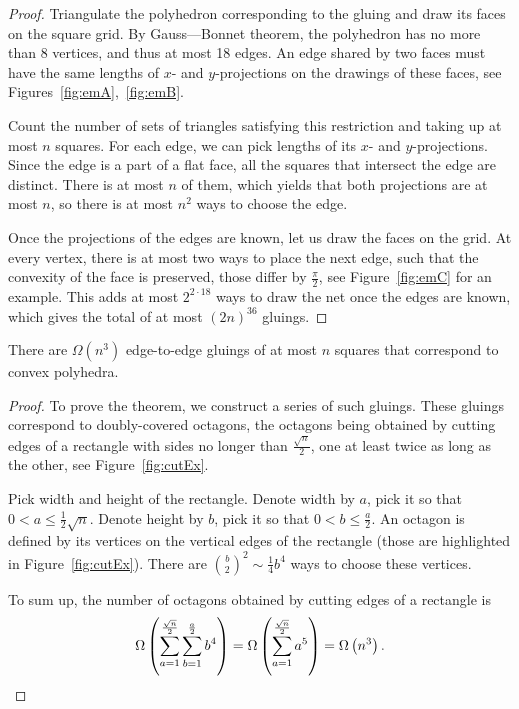 \documentclass[a4paper,11pt]{article}
\begin{document}
\begin{proof}
	Triangulate the polyhedron corresponding to the gluing and draw its faces on the square grid. By Gauss—Bonnet theorem, the polyhedron has no more than 8 vertices, and thus at most 18 edges. An edge shared by two faces must have the same lengths of $x$- and $y$-projections on the drawings of these faces, see Figures~\ref{fig:emA},~\ref{fig:emB}.



Count the number of sets of triangles satisfying this restriction and taking up at most $n$ squares. For each edge, we can pick lengths of its $x$- and $y$-projections. Since the edge is a part of a flat face, all the squares that intersect the edge are distinct. There is at most $n$ of them, which yields that both projections are at most $n$, so there is at most $n^2$ ways to choose the edge.

Once the projections of the edges are known, let us draw the faces on the grid. At every vertex, there is at most two ways to place the next edge, such that the convexity of the face is preserved, those differ by $\frac{\pi}{2}$, see Figure~\ref{fig:emC} for an example. This adds at most $2^{2 \cdot 18}$ ways to draw the net once the edges are known, which gives the total of at most $(2n)^{36}$ gluings.
\end{proof}

\begin{theorem} \label{thm:n3}
	There are $\Omega \left( n^3 \right)$ edge-to-edge gluings of at most $n$ squares that correspond to convex polyhedra.
\end{theorem}

\begin{proof}
To prove the theorem, we construct a series of such gluings. These gluings correspond to doubly-covered octagons, the octagons being obtained by cutting edges of a rectangle with sides no longer than $\frac{\sqrt{n}}{2}$, one at least twice as long as the other, see Figure~\ref{fig:cutEx}.



Pick width and height of the rectangle. Denote width by $a$, pick it so that $0 < a \le \frac12 \sqrt{n}$. Denote height by $b$, pick it so that $0 < b \le \frac{a}2$. An octagon is defined by its vertices on the vertical edges of the rectangle (those are highlighted in Figure~\ref{fig:cutEx}). There are $\binom{b}{2}^2 \sim \frac14 b^4$ ways to choose these vertices.

To sum up, the number of octagons obtained by cutting edges of a rectangle is
\[ \Omega\left( \sum\limits_{a=1}^{\frac{\sqrt{n}}{2}} \sum\limits_{b=1}^{\frac{a}{2}} b^4 \right) =
	\Omega\left( \sum\limits_{a=1}^{\frac{\sqrt{n}}{2}} a^5 \right) = \Omega \left( n^3 \right). \]

\end{proof}
\end{document}
